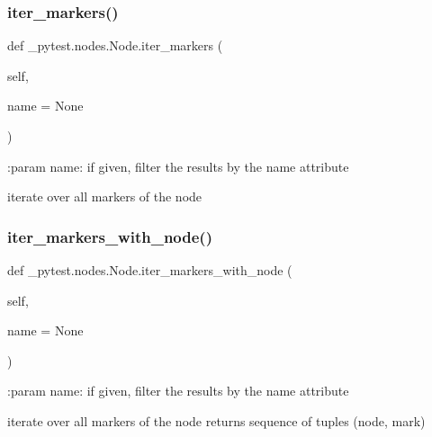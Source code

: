 \subsubsection{\texorpdfstring{iter\+\_\+markers()}{iter\_markers()}}
{\footnotesize\ttfamily def \+\_\+pytest.\+nodes.\+Node.\+iter\+\_\+markers (\begin{DoxyParamCaption}\item[{}]{self,  }\item[{}]{name = {\ttfamily None} }\end{DoxyParamCaption})}

\begin{DoxyVerb}:param name: if given, filter the results by the name attribute

iterate over all markers of the node
\end{DoxyVerb}
 \mbox{\label{class__pytest_1_1nodes_1_1_node_a141c959ae7dbfde9b8de55e11f841ed7}} 
\subsubsection{\texorpdfstring{iter\+\_\+markers\+\_\+with\+\_\+node()}{iter\_markers\_with\_node()}}
{\footnotesize\ttfamily def \+\_\+pytest.\+nodes.\+Node.\+iter\+\_\+markers\+\_\+with\+\_\+node (\begin{DoxyParamCaption}\item[{}]{self,  }\item[{}]{name = {\ttfamily None} }\end{DoxyParamCaption})}

\begin{DoxyVerb}:param name: if given, filter the results by the name attribute

iterate over all markers of the node
returns sequence of tuples (node, mark)
\end{DoxyVerb}
 \mbox{\label{class__pytest_1_1nodes_1_1_node_ae0847320698244a5c0a872d4aa19a618}} 
